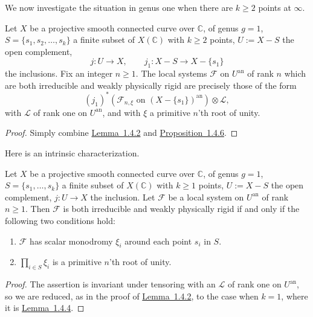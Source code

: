 We now investigate the situation in genus one when there are \(k\geq 2\) points
at \(\infty\).

\setcounter{theorem}{11}
\begin{proposition}
\label{prop:1.4.12}
Let \(X\) be a projective smooth connected curve over \(\mathbb{C}\), of genus
\(g=1\), \(S=\{s_1,s_2,\ldots,s_k\}\) a finite subset of \(X(\mathbb{C})\) with
\(k\geq 2\) points, \(U:=X-S\) the open complement,
\[
  j:U\to X,\qquad j_1:X-S\to X-\{s_1\}
\]
the inclusions. Fix an integer \(n\geq 1\). The local systems \(\mathcal{F}\) on
\(U^{\mathrm{an}}\) of rank \(n\) which are both irreducible and weakly
physically rigid are precisely those of the form
\[
  (j_1)^*(\mathcal{F}_{n,\xi}\text{ on }(X-\{s_1\})^{\mathrm{an}})\otimes
  \mathcal{L},
\]
with \(\mathcal{L}\) of rank one on \(U^{\mathrm{an}}\), and with \(\xi\) a
primitive \(n\)'th root of unity.
\end{proposition}

\begin{proof}
Simply combine \hyperref[lem:1.4.2]{Lemma~1.4.2} and
\hyperref[prop:1.4.6]{Proposition~1.4.6}.
\end{proof}

Here is an intrinsic characterization.

\setcounter{theorem}{12}
\begin{lemma}
\label{lem:1.4.13}
Let \(X\) be a projective smooth connected curve over \(\mathbb{C}\), of genus
\(g=1\), \(S=\{s_1,\ldots,s_k\}\) a finite subset of \(X(\mathbb{C})\) with
\(k\geq 1\) points, \(U:=X-S\) the open complement, \(j:U\to X\) the inclusion.
Let \(\mathcal{F}\) be a local system on \(U^{\mathrm{an}}\) of rank \(n\geq 1\).
Then \(\mathcal{F}\) is both irreducible and weakly physically rigid if and
only if the following two conditions hold:
\leavevmode\par
\begin{enumerate}[label=(\arabic*)]
\item \(\mathcal{F}\) has scalar monodromy \(\xi_i\) around each point \(s_i\)
in \(S\).
\item \(\prod_{i\in S}\xi_i\) is a primitive \(n\)'th root of unity.
\end{enumerate}
\end{lemma}

\begin{proof}
The assertion is invariant under tensoring with an \(\mathcal{L}\) of rank one
on \(U^{\mathrm{an}}\), so we are reduced, as in the proof of
\hyperref[lem:1.4.2]{Lemma~1.4.2}, to the case when \(k=1\), where it is
\hyperref[lem:1.4.4]{Lemma~1.4.4}.
\end{proof}

